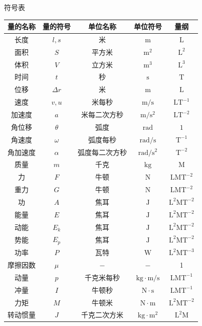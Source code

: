 \begin{center}
    \heiti {}符号表
    
    \kaishu {}
    \begin{tabular}{ccccc}
        \toprule
        量的名称&量的符号&单位名称&单位符号&量纲\\
        \midrule
        长度&$l,s$&米&$\mathrm{m}$&$\mathrm{L}$\\
        面积&$S$&平方米&$\mathrm{m^2}$&$\mathrm{L^2}$\\
        体积&$V$&立方米&$\mathrm{m^3}$&$\mathrm{L^3}$\\
        时间&$t$&秒&$\mathrm{s}$&$\mathrm{T}$\\
        位移&$\Delta r$&米&$\mathrm{m}$&$\mathrm{L}$\\
        速度&$v,u$&米每秒&$\mathrm{m/s}$&$\mathrm{LT^{-1}}$\\
        加速度&$a$&米每二次方秒&$\mathrm{m/s^2}$&$\mathrm{LT^{-2}}$\\
        角位移&$\theta$&弧度&$\mathrm{rad}$&$\mathrm{1}$\\
        角速度&$\omega$&弧度每秒&$\mathrm{rad/s}$&$\mathrm{T^{-1}}$\\
        角加速度&$\alpha$&弧度每二次方秒&$\mathrm{rad/s^2}$&$\mathrm{T^{-2}}$\\
        质量&$m$&千克&$\mathrm{kg}$&$\mathrm{M}$\\
        力&$F$&牛顿&$\mathrm{N}$&$\mathrm{LMT^{-2}}$\\
        重力&$G$&牛顿&$\mathrm{N}$&$\mathrm{LMT^{-2}}$\\
        功&$A$&焦耳&$\mathrm{J}$&$\mathrm{L^2MT^{-2}}$\\
        能量&$E$&焦耳&$\mathrm{J}$&$\mathrm{L^2MT^{-2}}$\\
        动能&$E_k$&焦耳&$\mathrm{J}$&$\mathrm{L^2MT^{-2}}$\\
        势能&$E_p$&焦耳&$\mathrm{J}$&$\mathrm{L^2MT^{-2}}$\\
        功率&$P$&瓦特&$\mathrm{W}$&$\mathrm{L^2MT^{-3}}$\\
        摩擦因数&$\mu $&$\mathrm{-}$&$\mathrm{-}$&1\\
        动量&$p$&千克米每秒&$\mathrm{kg\cdot m/s}$&$\mathrm{LMT^{-1}}$\\
        冲量&$I$&牛顿秒&$\mathrm{N\cdot s}$&$\mathrm{LMT^{-1}}$\\
        力矩&$M$&牛顿米&$\mathrm{N\cdot m}$&$\mathrm{L^2MT^{-2}}$\\
        转动惯量&$J$&千克二次方米&$\mathrm{kg\cdot m^2}$&$\mathrm{L^2M}$\\

\end{tabular}
\end{center}
